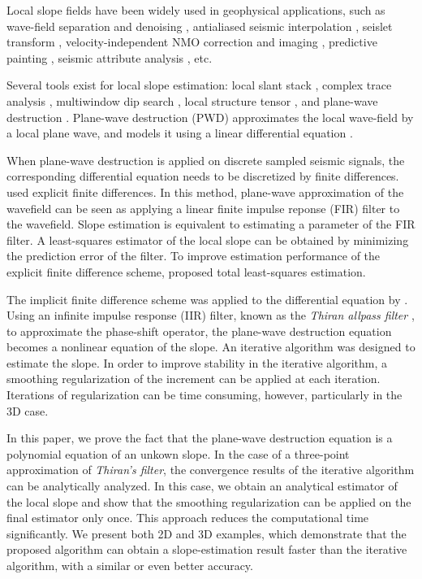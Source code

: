 Local slope fields have been widely used
in geophysical applications,
such as wave-field separation and denoising \cite[]{harlan:1869,fomel:U89},
antialiased seismic interpolation \cite[]{GPR:GPR343},
seislet transform \cite[]{fomel:V25},
velocity-independent NMO correction and imaging \cite[]{fomel:S139,cooke:WCA65},
predictive painting \cite[]{fomel:A25},
seismic attribute analysis \cite[]{marfurt:104}, etc.

Several tools exist for local slope estimation:
local slant stack \cite[]{ottolini1983signal,harlan:1869},
complex trace analysis \cite[]{barnes:264},
multiwindow dip search \cite[]{marfurt:P29},
local structure tensor \cite[]{fehmers:1286,halelocal},
and plane-wave destruction \cite[]{claerbout1992earth,fomel:1946}.
Plane-wave destruction (PWD) approximates 
the local wave-field by a local plane wave,
and models it using a linear differential equation \cite[]{claerbout1992earth}.

When plane-wave destruction is applied on discrete sampled seismic signals, 
the corresponding differential equation needs to be discretized by finite differences.
\cite{claerbout1992earth} used explicit finite differences.
In this method, plane-wave approximation of the wavefield can be seen as 
applying a linear finite impulse reponse (FIR) filter to the wavefield.
Slope estimation is equivalent to estimating a parameter of the FIR filter.
A least-squares estimator of the local slope can be obtained 
by minimizing the prediction error of the filter.
To improve estimation performance of the explicit finite difference scheme,
\cite{schleicher:P25} proposed total least-squares estimation.

The implicit finite difference scheme was applied to 
the differential equation by \cite{fomel:1946}.
Using an infinite impulse response (IIR) filter,
known as the \textit{Thiran allpass filter} 
\cite[]{thiran1971recursive},
to approximate the phase-shift operator,
the plane-wave destruction equation becomes
a nonlinear equation of the slope.
An iterative algorithm was designed to estimate the slope.
In order to improve stability in the iterative algorithm,
a smoothing regularization \cite[]{fomel:R29} of the increment 
can be applied at each iteration.
Iterations of regularization can be time consuming, 
however, particularly in the 3D case.

In this paper, we prove the fact that
the plane-wave destruction equation is
a polynomial equation of an unkown slope.
In the case of a three-point approximation of \textit{Thiran's filter},
the convergence results
of the iterative algorithm can be analytically analyzed.
In this case, we obtain an analytical estimator of the local slope
and show that the smoothing regularization can be applied on 
the final estimator only once.
This approach reduces the computational time significantly.
We present both 2D and 3D examples, 
which demonstrate that the proposed algorithm can 
obtain a slope-estimation result faster than the iterative algorithm,
with a similar or even better accuracy.

